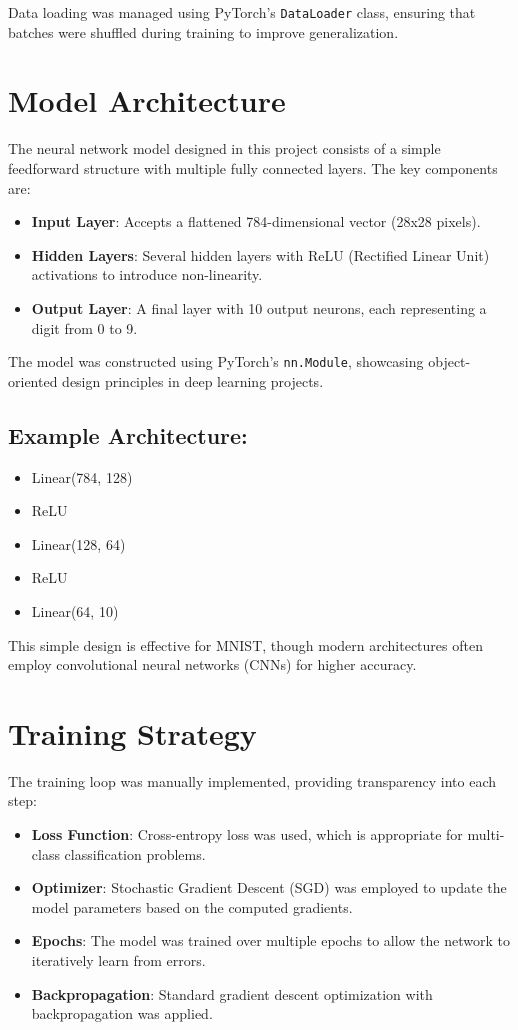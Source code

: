 \documentclass{article}
\begin{document}
Data loading was managed using PyTorch's \texttt{DataLoader} class, ensuring that batches were shuffled during training to improve generalization.

\section{Model Architecture}
The neural network model designed in this project consists of a simple feedforward structure with multiple fully connected layers. The key components are:
\begin{itemize}
    \item \textbf{Input Layer}: Accepts a flattened 784-dimensional vector (28x28 pixels).
    \item \textbf{Hidden Layers}: Several hidden layers with ReLU (Rectified Linear Unit) activations to introduce non-linearity.
    \item \textbf{Output Layer}: A final layer with 10 output neurons, each representing a digit from 0 to 9.
\end{itemize}

The model was constructed using PyTorch's \texttt{nn.Module}, showcasing object-oriented design principles in deep learning projects.

\subsection*{Example Architecture:}
\begin{itemize}
    \item Linear(784, 128)
    \item ReLU
    \item Linear(128, 64)
    \item ReLU
    \item Linear(64, 10)
\end{itemize}

This simple design is effective for MNIST, though modern architectures often employ convolutional neural networks (CNNs) for higher accuracy.

\section{Training Strategy}
The training loop was manually implemented, providing transparency into each step:
\begin{itemize}
    \item \textbf{Loss Function}: Cross-entropy loss was used, which is appropriate for multi-class classification problems.
    \item \textbf{Optimizer}: Stochastic Gradient Descent (SGD) was employed to update the model parameters based on the computed gradients.
    \item \textbf{Epochs}: The model was trained over multiple epochs to allow the network to iteratively learn from errors.
    \item \textbf{Backpropagation}: Standard gradient descent optimization with backpropagation was applied.
\end{itemize}
\end{document}
